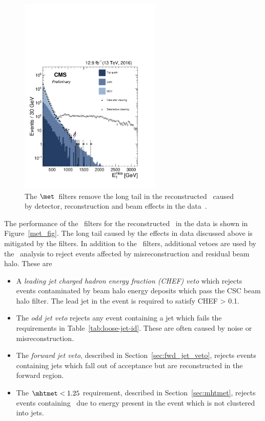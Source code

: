 \begin{figure}
\centering
    \includegraphics[width=0.6\textwidth]{./Figures/alphat/met_clean}
  \caption{\label{fig:met_filter} The $\met$~filters remove the long tail in the reconstructed \met~caused by detector, reconstruction
  and beam effects in the data~\cite{met_fig}.} 
\end{figure}
The performance of the \met~filters for the reconstructed \met~in the data is shown in Figure~\ref{met_fig}. The long tail caused by
the effects in data discussed above is mitigated by the filters. In addition to the \met~filters, 
additional vetoes are used by the \alphat~analysis to reject events affected by misreconstruction and residual beam halo. These are
\begin{itemize}
\item A \emph{leading jet charged hadron energy fraction (CHEF) veto} which rejects events 
contaminated by beam halo energy deposits which pass the CSC beam halo filter. The lead jet 
in the event is required to satisfy CHEF > 0.1.
\item The \emph{odd jet veto} rejects any event containing a jet which fails the 
requirements in Table~\ref{tab:loose-jet-id}. These are often caused by noise or misreconstruction.
\item The \emph{forward jet veto}, described in Section~\ref{sec:fwd_jet_veto}, rejects events containing jets which fall out of acceptance but
are reconstructed in the forward region. 
\item The $\mhtmet < 1.25$ requirement, described in Section~\ref{sec:mhtmet}, rejects events containing 
\mht~due to energy present in the event which is not clustered into jets. 
\end{itemize}

